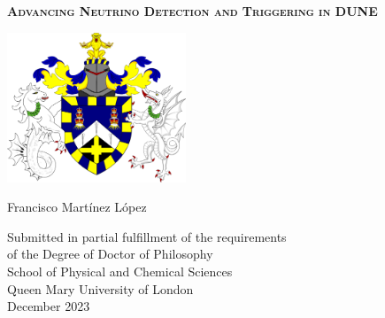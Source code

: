 \begin{titlepage}



\begin{center}

\begin{spacing}{2.5}
{\Huge \textsc{\textbf{Advancing Neutrino Detection and Triggering in DUNE}}}
\end{spacing}

\vspace{1.0 cm}

\begin{center}
\includegraphics[width=0.4\textwidth]{Images/QM_crest}
\end{center}
\vspace{0.9cm}


{\LARGE Francisco Martínez López} %

\vspace{1cm}


{\large \sffamily
Submitted in partial fulfillment of the
requirements \\ of the Degree of Doctor of Philosophy\\
\vspace{0.9 cm}
School of Physical and Chemical Sciences\\
\vspace{0.5 cm}
Queen Mary University of London\\
\vspace{0.5cm}
December 2023 %
}

\end{center}



\end{titlepage}

\restoregeometry  %
\doublespacing		%
